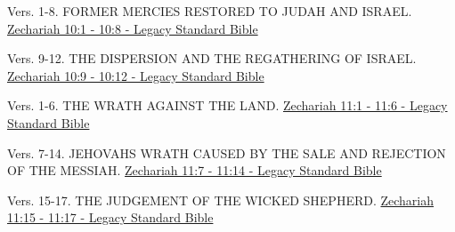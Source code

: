 \documentclass[
  ignorenonframetext,
]{beamer}
\begin{document}
\begin{frame}{10}
\label{section-143}
\begin{block}{Vers. 1-8. FORMER MERCIES RESTORED TO JUDAH AND ISRAEL.}
\label{vers.-1-8.-former-mercies-restored-to-judah-and-israel.}
\href{https://read.lsbible.org/?q=zech10\%3A1-8}{Zechariah 10:1 - 10:8 -
Legacy Standard Bible}
\end{block}

\begin{block}{Vers. 9-12. THE DISPERSION AND THE REGATHERING OF ISRAEL.}
\label{vers.-9-12.-the-dispersion-and-the-regathering-of-israel.}
\href{https://read.lsbible.org/?q=zech10\%3A9-12}{Zechariah 10:9 - 10:12
- Legacy Standard Bible}
\end{block}
\end{frame}

\begin{frame}{11}
\label{section-144}
\begin{block}{Vers. 1-6. THE WRATH AGAINST THE LAND.}
\label{vers.-1-6.-the-wrath-against-the-land.}
\href{https://read.lsbible.org/?q=zech11\%3A1-6}{Zechariah 11:1 - 11:6 -
Legacy Standard Bible}
\end{block}

\begin{block}{Vers. 7-14. JEHOVAH\textquotesingle S WRATH CAUSED BY THE
SALE AND REJECTION OF THE MESSIAH.}
\label{vers.-7-14.-jehovahs-wrath-caused-by-the-sale-and-rejection-of-the-messiah.}
\href{https://read.lsbible.org/?q=zech11\%3A7-14}{Zechariah 11:7 - 11:14
- Legacy Standard Bible}
\end{block}

\begin{block}{Vers. 15-17. THE JUDGEMENT OF THE WICKED SHEPHERD.}
\label{vers.-15-17.-the-judgement-of-the-wicked-shepherd.}
\href{https://read.lsbible.org/?q=zech11\%3A15-17}{Zechariah 11:15 -
11:17 - Legacy Standard Bible}
\end{block}
\end{frame}
\end{document}
